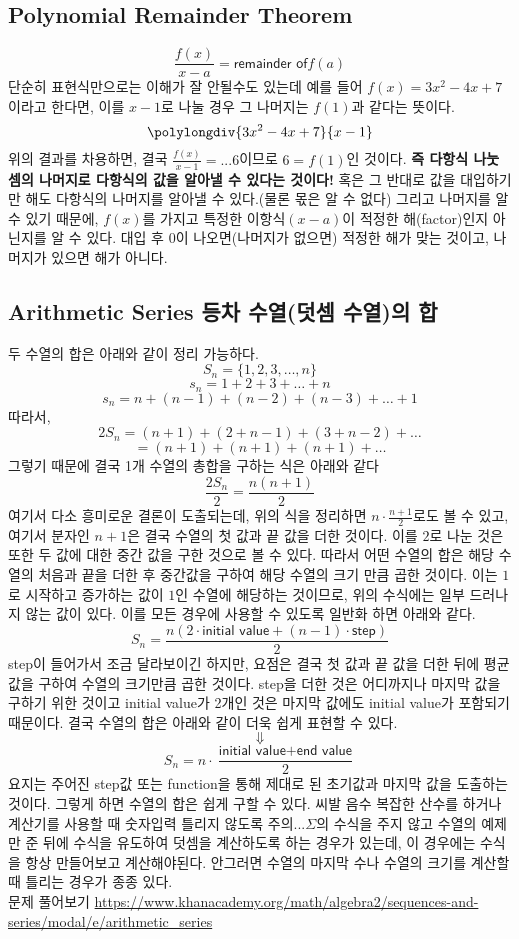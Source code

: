 \documentclass{article}
\begin{document}
\subsection{Polynomial Remainder Theorem}
$$\frac{f(x)}{x-a}={\textsf{remainder of}} f(a)$$
단순히 표현식만으로는 이해가 잘 안될수도 있는데 예를 들어 $f(x) = 3x^{2}-4x+7$이라고 한다면, 이를 $x-1$로 나눌 경우 그 나머지는 $f(1)$과 같다는 뜻이다.
$$\polylongdiv{3x^{2}-4x+7}{x-1}$$
위의 결과를 차용하면, 결국 $\frac{f(x)}{x-1}=...6$이므로 $6=f(1)$인 것이다. \textbf{즉 다항식 나눗셈의 나머지로 다항식의 값을 알아낼 수 있다는 것이다!} 혹은 그 반대로 값을 대입하기만 해도 다항식의 나머지를 알아낼 수 있다.(물론 몫은 알 수 없다) 그리고 나머지를 알 수 있기 때문에, $f(x)$를 가지고 특정한 이항식$(x-a)$이 적정한 해(factor)인지 아닌지를 알 수 있다. 대입 후 0이 나오면(나머지가 없으면) 적정한 해가 맞는 것이고, 나머지가 있으면 해가 아니다.

\subsection{Arithmetic Series 등차 수열(덧셈 수열)의 합}
두 수열의 합은 아래와 같이 정리 가능하다.
$$S_n=\{1,2,3,\dots,n\}$$
$$s_n=1+2+3+\dots+n$$
$$s_n=n+(n-1)+(n-2)+(n-3)+\dots+1$$
따라서,
$$2S_n=(n+1)+(2+n-1)+(3+n-2)+\dots$$
$$=(n+1)+(n+1)+(n+1)+\dots$$
그렇기 때문에 결국 1개 수열의 총합을 구하는 식은 아래와 같다
$$\frac{2S_n}{2}=\frac{n(n+1)}{2}$$
여기서 다소 흥미로운 결론이 도출되는데, 위의 식을 정리하면 $n\cdot\frac{n+1}{2}$로도 볼 수 있고, 여기서 분자인 $n+1$은 결국 수열의 첫 값과 끝 값을 더한 것이다. 이를 $2$로 나눈 것은 또한 두 값에 대한 중간 값을 구한 것으로 볼 수 있다. 따라서 어떤 수열의 합은 해당 수열의 처음과 끝을 더한 후 중간값을 구하여 해당 수열의 크기 만큼 곱한 것이다. 이는 $1$로 시작하고 증가하는 값이 $1$인 수열에 해당하는 것이므로, 위의 수식에는 일부 드러나지 않는 값이 있다. 이를 모든 경우에 사용할 수 있도록 일반화 하면 아래와 같다.
$$S_n=\frac{n(2\cdot\textsf{initial value}+(n-1)\cdot\textsf{step})}{2}$$ step이 들어가서 조금 달라보이긴 하지만, 요점은 결국 첫 값과 끝 값을 더한 뒤에 평균 값을 구하여 수열의 크기만큼 곱한 것이다. step을 더한 것은 어디까지나 마지막 값을 구하기 위한 것이고 initial value가 2개인 것은 마지막 값에도 initial value가 포함되기 때문이다. 결국 수열의 합은 아래와 같이 더욱 쉽게 표현할 수 있다.
$$\Downarrow$$
$$S_n=n\cdot\frac{\textsf{initial value} + \textsf{end value}}{2}$$
요지는 주어진 step값 또는 function을 통해 제대로 된 초기값과 마지막 값을 도출하는 것이다. 그렇게 하면 수열의 합은 쉽게 구할 수 있다.
{\color{red}씨발 음수} 복잡한 산수를 하거나 계산기를 사용할 때 숫자입력 틀리지 않도록 주의...$\Sigma$의 수식을 주지 않고 수열의 예제만 준 뒤에 수식을 유도하여 덧셈을 계산하도록 하는 경우가 있는데, 이 경우에는 수식을 항상 만들어보고 계산해야된다. 안그러면 수열의 마지막 수나 수열의 크기를 계산할 때 틀리는 경우가 종종 있다.\\
문제 풀어보기 \url{https://www.khanacademy.org/math/algebra2/sequences-and-series/modal/e/arithmetic_series}\\
\end{document}
